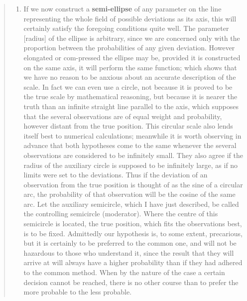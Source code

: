 \documentclass[
]{article}
\providecommand{\tightlist}{%
  \setlength{\itemsep}{0pt}\setlength{\parskip}{0pt}}
\begin{document}
\begin{quote}
\begin{enumerate}
\def\labelenumi{\arabic{enumi}.}
\setcounter{enumi}{7}
\tightlist
\item
  If we now construct a \textbf{semi-ellipse} of any parameter on the
  line representing the whole field of possible deviations as its axis,
  this will certainly satisfy the foregoing conditions quite well. The
  parameter {[}radius{]} of the ellipse is arbitrary, since we are
  concerned only with the proportion between the probabilities of any
  given deviation. However elongated or com-pressed the ellipse may be,
  provided it is constructed on the same axis, it will perform the same
  function; which shows that we have no reason to be anxious about an
  accurate description of the scale. In fact we can even use a circle,
  not because it is proved to be the true scale by mathematical
  reasoning, but because it is nearer the truth than an infinite
  straight line parallel to the axis, which supposes that the several
  observations are of equal weight and probability, however distant from
  the true position. This circular scale also lends itself best to
  numerical calculations; meanwhile it is worth observing in advance
  that both hypotheses come to the same whenever the several
  observations are considered to be infinitely small. They also agree if
  the radius of the auxiliary circle is supposed to be infinitely large,
  as if no limits were set to the deviations. Thus if the deviation of
  an observation from the true position is thought of as the sine of a
  circular arc, the probability of that observation will be the cosine
  of the same arc. Let the auxiliary semicircle, which I have just
  described, be called the controlling semicircle (moderator). Where the
  centre of this semicircle is located, the true position, which fits
  the observations best, is to be fixed. Admittedly our hypothesis is,
  to some extent, precarious, but it is certainly to be preferred to the
  common one, and will not be hazardous to those who understand it,
  since the result that they will arrive at will always have a higher
  probability than if they had adhered to the common method. When by the
  nature of the case a certain decision cannot be reached, there is no
  other course than to prefer the more probable to the less probable.
\end{enumerate}
\end{quote}
\end{document}
